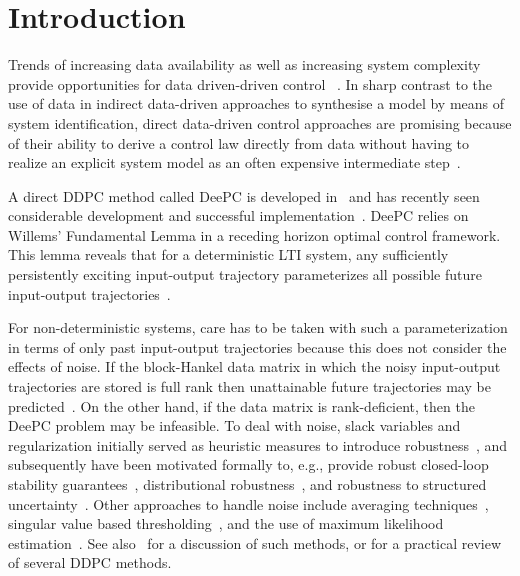 \section{Introduction}\label{sec:introduction}
\noindent Trends of increasing data availability as well as increasing system complexity provide opportunities for data driven-driven control%
~\citep{Markovsky2023}. %
In sharp contrast to the use of data in %
indirect data-driven approaches to synthesise a model by means of system identification, direct data-driven control approaches are promising because of their ability to derive a control law directly from data without having to realize an explicit system model as an often expensive intermediate step~\citep{Hjalmarsson2005}.

A direct \ac{DDPC} method called \acf{DeePC} is developed in~\cite{Coulson2019} and has recently seen considerable development and successful implementation~\citep{Markovsky2023}. \ac{DeePC} relies on Willems' Fundamental Lemma in a receding horizon optimal control framework. This lemma reveals that for a deterministic \ac{LTI} system, any sufficiently persistently exciting input-output trajectory parameterizes all possible future input-output trajectories~\citep{Willems2005}.

For non-deterministic systems, care has to be taken with such a parameterization in terms of only past input-output trajectories because this does not consider the effects of noise. If the block-Hankel data matrix in which the noisy input-output trajectories are stored is full rank then unattainable future trajectories may be predicted~\citep{Markovsky2023}. On the other hand, if the data matrix is rank-deficient, then the \ac{DeePC} problem may be infeasible. To deal with noise, slack variables and regularization initially served as heuristic measures to introduce robustness~\citep{Coulson2019}, and subsequently have been motivated formally to, e.g., provide robust closed-loop stability guarantees~\citep{Berberich2021}, distributional robustness~\citep{Coulson2019a}, and robustness to structured uncertainty~\citep{Huang2023}. Other approaches to handle noise include averaging techniques~\citep{Jo2022}, singular value based thresholding~\citep{Sassella2022}, and the use of maximum likelihood estimation~\citep{Yin2023}. See also~\cite{Sassella2023} for a discussion of such methods, or \cite{Verheijen2023} for a practical review of several \ac{DDPC} methods.%

